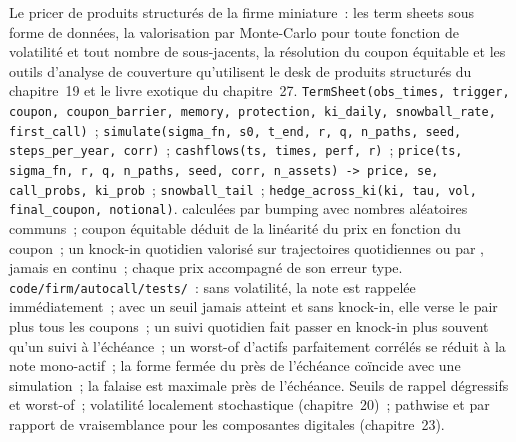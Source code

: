 \begin{build}
 Le pricer de produits structurés de la firme miniature~: les term sheets sous forme de données, la valorisation par Monte-Carlo pour toute fonction de volatilité et tout nombre de sous-jacents,
la résolution du coupon équitable et les outils d'analyse de couverture qu'utilisent le desk de produits structurés du chapitre~19 et le livre exotique
du chapitre~27. 
\texttt{TermSheet(obs\_times, trigger, coupon, coupon\_barrier, memory, protection, ki\_daily, snowball\_rate,
first\_call)}~; \texttt{simulate(sigma\_fn, s0, t\_end, r, q, n\_paths, seed, steps\_per\_year, corr)}~; \texttt{cashflows(ts, times,
perf, r)}~; \texttt{price(ts, sigma\_fn, r, q, n\_paths, seed, corr, n\_assets) -> price, se, call\_probs, ki\_prob}~; \texttt{snowball\_tail}~;
\texttt{hedge\_across\_ki(ki, tau, vol, final\_coupon, notional)}.
  calculées par bumping avec nombres aléatoires communs~; coupon équitable déduit de la linéarité du prix en fonction du coupon~; un knock-in quotidien
valorisé sur trajectoires quotidiennes ou par , jamais en continu~; chaque prix accompagné de son erreur type.
 \texttt{code/firm/autocall/tests/}~: sans volatilité, la note est rappelée immédiatement~; avec un seuil jamais atteint
et sans knock-in, elle verse le pair plus tous les coupons~; un suivi quotidien fait passer en knock-in plus souvent qu'un suivi à l'échéance~; un worst-of d'actifs parfaitement corrélés se réduit à la note mono-actif~;
la forme fermée du  près de l'échéance coïncide avec une simulation~; la falaise est maximale près de
l'échéance.
 Seuils de rappel dégressifs et  worst-of~; volatilité localement stochastique (chapitre~20)~;  pathwise et  par rapport de vraisemblance
pour les composantes digitales (chapitre~23).
\end{build}

